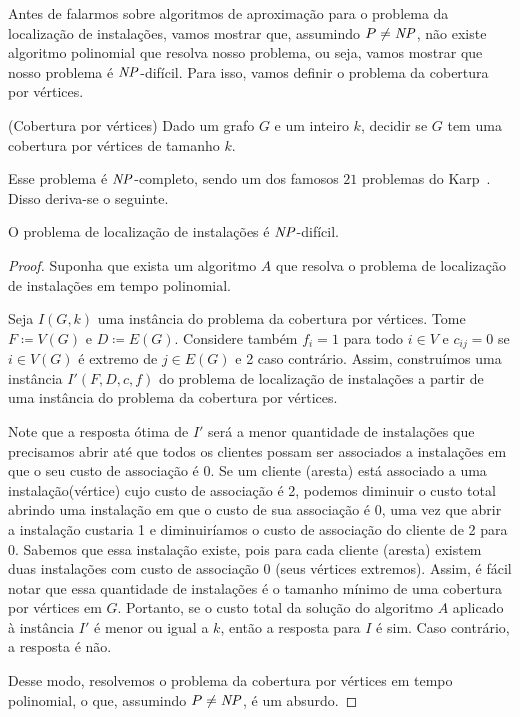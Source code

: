 Antes de falarmos sobre algoritmos de aproximação para o problema da localização de instalações, vamos mostrar que, assumindo $P\neq\mathit{NP}$, não existe algoritmo polinomial que resolva nosso problema, ou seja, vamos mostrar que nosso problema é $\mathit{NP}$-difícil. Para isso, vamos definir o problema da cobertura por vértices.



\begin{problem}(Cobertura por vértices)
    Dado um grafo $G$ e um inteiro $k$, decidir se $G$ tem uma cobertura por vértices de tamanho $k$.
\end{problem}
Esse problema é $\mathit{NP}$-completo, sendo um dos famosos $21$ problemas do Karp~\cite{Karp1972}. Disso deriva-se o seguinte.

\begin{theorem}
    O problema de localização de instalações é $\mathit{NP}$-difícil.
\end{theorem}

\begin{proof}
    Suponha que exista um algoritmo $A$ que resolva o problema de localização de instalações em tempo polinomial.

    Seja $I(G,k)$ uma instância do problema da cobertura por vértices. Tome $F \coloneqq V(G)$ e $D \coloneqq E(G)$. Considere também $f_i = 1$ para todo $i \in V$ e $c_{ij} = 0$ se $i \in V(G)$ é extremo de $j \in E(G)$ e 2 caso contrário. Assim, construímos uma instância $I'(F,D,c,f)$ do problema de localização de instalações a partir de uma instância do problema da cobertura por vértices. 

    Note que a resposta ótima de $I'$ será a menor quantidade de instalações que precisamos abrir até que todos os clientes possam ser associados a instalações em que o seu custo de associação é 0. Se um cliente (aresta) está associado a uma instalação(vértice) cujo custo de associação é 2, podemos diminuir o custo total abrindo uma instalação em que o custo de sua associação é 0, uma vez que abrir a instalação custaria 1 e diminuiríamos o custo de associação do cliente de 2 para 0. Sabemos que essa instalação existe, pois para cada cliente (aresta) existem duas instalações com custo de associação 0 (seus vértices extremos).
    Assim, é fácil notar que essa quantidade de instalações é o tamanho mínimo de uma cobertura por vértices em $G$. Portanto, se o custo total da solução do algoritmo $A$ aplicado à instância $I'$ é menor ou igual a $k$, então a resposta para $I$ é sim. Caso contrário, a resposta é não.

    Desse modo, resolvemos o problema da cobertura por vértices em tempo polinomial, o que, assumindo $P\neq\mathit{NP}$, é um absurdo.
\end{proof}